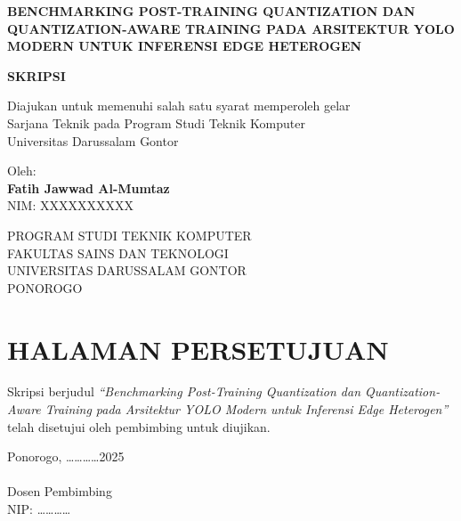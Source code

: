 \documentclass[12pt, a4paper]{report}
\begin{document}
\begin{titlepage}
  \centering
  \vspace*{1cm}
  {\Large \textbf{BENCHMARKING POST-TRAINING QUANTIZATION DAN
  QUANTIZATION-AWARE TRAINING PADA ARSITEKTUR YOLO MODERN
  UNTUK INFERENSI EDGE HETEROGEN}}
  \vspace{1.5cm}

  {\large \textbf{SKRIPSI}}
  \vspace{1cm}

  Diajukan untuk memenuhi salah satu syarat memperoleh gelar\\
  Sarjana Teknik pada Program Studi Teknik Komputer\\
  Universitas Darussalam Gontor
  \vspace{1.5cm}

  \vspace{1.5cm}

  Oleh:\\
  \textbf{Fatih Jawwad Al-Mumtaz}\\
  NIM: XXXXXXXXXX

  \vfill
  {\large
    PROGRAM STUDI TEKNIK KOMPUTER\\
    FAKULTAS SAINS DAN TEKNOLOGI\\
    UNIVERSITAS DARUSSALAM GONTOR\\
    PONOROGO\\
    \the\year
  }
\end{titlepage}

\setcounter{page}{2}

\chapter*{HALAMAN PERSETUJUAN}
\vspace{2cm}
\noindent Skripsi berjudul \textit{``Benchmarking Post-Training Quantization dan
Quantization-Aware Training pada Arsitektur YOLO Modern untuk Inferensi
Edge Heterogen''} telah disetujui oleh pembimbing untuk diujikan.
\vspace{3cm}
\begin{flushright}
  Ponorogo, \ldots\ldots\ldots\ldots 2025\\[2cm]
  \underline{\hspace{5cm}}\\
  Dosen Pembimbing\\
  NIP: \ldots\ldots\ldots\ldots
\end{flushright}
\newpage
\end{document}
